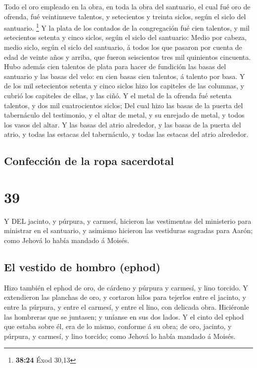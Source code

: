  Todo el oro empleado en la obra, en toda la obra del
santuario, el cual fué oro de ofrenda, fué veintinueve talentos, y
setecientos y treinta siclos, según el siclo del santuario. \footnote{\textbf{38:24}
  Éxod 30,13}  Y la plata de los contados de la
congregación fué cien talentos, y mil setecientos setenta y cinco
siclos, según el siclo del santuario:  Medio por cabeza,
medio siclo, según el siclo del santuario, á todos los que pasaron por
cuenta de edad de veinte años y arriba, que fueron seiscientos tres mil
quinientos cincuenta.  Hubo además cien talentos de plata
para hacer de fundición las basas del santuario y las basas del velo: en
cien basas cien talentos, á talento por basa.  Y de los mil
setecientos setenta y cinco siclos hizo los capiteles de las columnas, y
cubrió los capiteles de ellas, y las ciñó.  Y el metal de
la ofrenda fué setenta talentos, y dos mil cuatrocientos siclos;
 Del cual hizo las basas de la puerta del tabernáculo del
testimonio, y el altar de metal, y su enrejado de metal, y todos los
vasos del altar.  Y las basas del atrio alrededor, y las
basas de la puerta del atrio, y todas las estacas del tabernáculo, y
todas las estacas del atrio alrededor.

\hypertarget{confecciuxf3n-de-la-ropa-sacerdotal}{%
\subsection{Confección de la ropa
sacerdotal}\label{confecciuxf3n-de-la-ropa-sacerdotal}}

\hypertarget{section-38}{%
\section{39}\label{section-38}}

 Y DEL jacinto, y púrpura, y carmesí, hicieron las
vestimentas del ministerio para ministrar en el santuario, y asimismo
hicieron las vestiduras sagradas para Aarón; como Jehová lo había
mandado á Moisés.

\hypertarget{el-vestido-de-hombro-ephod-1}{%
\subsection{El vestido de hombro
(ephod)}\label{el-vestido-de-hombro-ephod-1}}

 Hizo también el ephod de oro, de cárdeno y púrpura y
carmesí, y lino torcido.  Y extendieron las planchas de oro,
y cortaron hilos para tejerlos entre el jacinto, y entre la púrpura, y
entre el carmesí, y entre el lino, con delicada obra. 
Hiciéronle las hombreras que se juntasen; y uníanse en sus dos lados.
 Y el cinto del ephod que estaba sobre él, era de lo mismo,
conforme á su obra; de oro, jacinto, y púrpura, y carmesí, y lino
torcido; como Jehová lo había mandado á Moisés.

